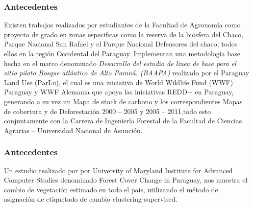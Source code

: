 \documentclass[xcolor=table]{beamer}
\begin{document}


\begin{frame}
	\frametitle{Antecedentes}

	Existen trabajos realizados por estudiantes de la Facultad de Agronom\'ia como proyecto de grado en zonas especificas como la reserva de la biosfera del Chaco, Parque Nacional San Rafael y el Parque Nacional Defensores del chaco, todos ellos en la regi\'on Occidental del Paraguay. Implementan una metodolog\'ia base hecha en el marco denominado \textit{Desarrollo del estudio de linea de base para el sitio piloto Bosque atl\'antico de Alto Paran\'a. (BAAPA)} realizado por el Paraguay Land Use (ParLu), el cual es una iniciativa de World Wildlife Fund (WWF)	Paraguay y WWF Alemania que apoya las iniciativas REDD+ en Paraguay, generando a su vez un Mapa de stock de carbono y los correspondientes Mapas de cobertura y de Deforestaci\'on 2000 – 2005 y 2005 – 2011,todo esto conjuntamente con la  Carrera de Ingenier\'ia Forestal de la Facultad de Ciencias Agrarias – Universidad Nacional de Asunci\'on.
	
	
\end{frame}



\begin{frame}
	\frametitle{Antecedentes}
	
Un estudio realizado por por University of Maryland Institute for Advanced Computer Studies denominado Forest Cover Change in Paraguay, nos muestra el cambio de vegetaci\'on estimado en todo el pais, utilizando el m\'etodo de asignaci\'on de etiquetado de cambio  clustering-supervised.
	
\end{frame}
\end{document}
